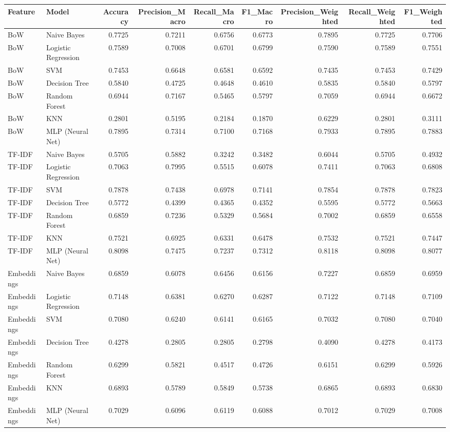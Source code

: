 \begin{tabular}{llrrrrrrr}
\toprule
Feature & Model & Accuracy & Precision_Macro & Recall_Macro & F1_Macro & Precision_Weighted & Recall_Weighted & F1_Weighted \\
\midrule
BoW & Naive Bayes & 0.7725 & 0.7211 & 0.6756 & 0.6773 & 0.7895 & 0.7725 & 0.7706 \\
BoW & Logistic Regression & 0.7589 & 0.7008 & 0.6701 & 0.6799 & 0.7590 & 0.7589 & 0.7551 \\
BoW & SVM & 0.7453 & 0.6648 & 0.6581 & 0.6592 & 0.7435 & 0.7453 & 0.7429 \\
BoW & Decision Tree & 0.5840 & 0.4725 & 0.4648 & 0.4610 & 0.5835 & 0.5840 & 0.5797 \\
BoW & Random Forest & 0.6944 & 0.7167 & 0.5465 & 0.5797 & 0.7059 & 0.6944 & 0.6672 \\
BoW & KNN & 0.2801 & 0.5195 & 0.2184 & 0.1870 & 0.6229 & 0.2801 & 0.3111 \\
BoW & MLP (Neural Net) & 0.7895 & 0.7314 & 0.7100 & 0.7168 & 0.7933 & 0.7895 & 0.7883 \\
TF-IDF & Naive Bayes & 0.5705 & 0.5882 & 0.3242 & 0.3482 & 0.6044 & 0.5705 & 0.4932 \\
TF-IDF & Logistic Regression & 0.7063 & 0.7995 & 0.5515 & 0.6078 & 0.7411 & 0.7063 & 0.6808 \\
TF-IDF & SVM & 0.7878 & 0.7438 & 0.6978 & 0.7141 & 0.7854 & 0.7878 & 0.7823 \\
TF-IDF & Decision Tree & 0.5772 & 0.4399 & 0.4365 & 0.4352 & 0.5595 & 0.5772 & 0.5663 \\
TF-IDF & Random Forest & 0.6859 & 0.7236 & 0.5329 & 0.5684 & 0.7002 & 0.6859 & 0.6558 \\
TF-IDF & KNN & 0.7521 & 0.6925 & 0.6331 & 0.6478 & 0.7532 & 0.7521 & 0.7447 \\
TF-IDF & MLP (Neural Net) & 0.8098 & 0.7475 & 0.7237 & 0.7312 & 0.8118 & 0.8098 & 0.8077 \\
Embeddings & Naive Bayes & 0.6859 & 0.6078 & 0.6456 & 0.6156 & 0.7227 & 0.6859 & 0.6959 \\
Embeddings & Logistic Regression & 0.7148 & 0.6381 & 0.6270 & 0.6287 & 0.7122 & 0.7148 & 0.7109 \\
Embeddings & SVM & 0.7080 & 0.6240 & 0.6141 & 0.6165 & 0.7032 & 0.7080 & 0.7040 \\
Embeddings & Decision Tree & 0.4278 & 0.2805 & 0.2805 & 0.2798 & 0.4090 & 0.4278 & 0.4173 \\
Embeddings & Random Forest & 0.6299 & 0.5821 & 0.4517 & 0.4726 & 0.6151 & 0.6299 & 0.5926 \\
Embeddings & KNN & 0.6893 & 0.5789 & 0.5849 & 0.5738 & 0.6865 & 0.6893 & 0.6830 \\
Embeddings & MLP (Neural Net) & 0.7029 & 0.6096 & 0.6119 & 0.6088 & 0.7012 & 0.7029 & 0.7008 \\
\bottomrule
\end{tabular}
